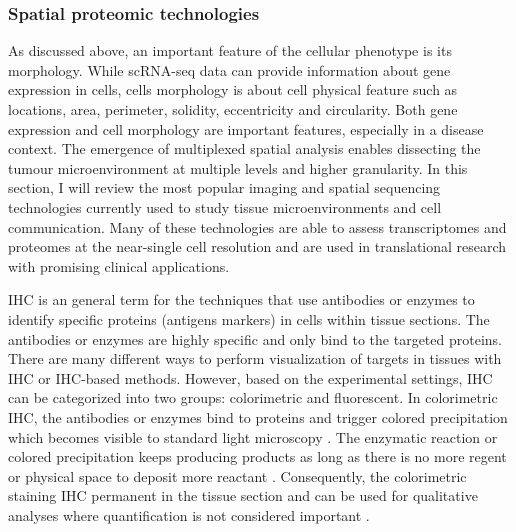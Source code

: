 \subsubsection{Spatial proteomic technologies}
As discussed above, an important feature of the cellular phenotype is its morphology. While scRNA-seq data can provide information about gene expression in cells, cells morphology is about cell physical feature such as locations, area, perimeter, solidity, eccentricity and circularity. Both gene expression and cell morphology are important features, especially in a disease context. The emergence of multiplexed spatial analysis enables dissecting the tumour microenvironment at multiple levels and higher granularity. In this section, I will review the most popular imaging and spatial sequencing technologies currently used to study tissue microenvironments and cell communication. Many of these technologies are able to assess transcriptomes and proteomes at the near-single cell resolution and are used in translational research with promising clinical applications. 

IHC is an general term for the techniques that use antibodies or enzymes to identify specific proteins (antigens markers) in cells within tissue sections. The antibodies or enzymes are highly specific and only bind to the targeted proteins. There are many different ways to perform visualization of targets in tissues with IHC or IHC-based methods. However, based on the experimental settings, IHC can be categorized into two groups: colorimetric and fluorescent. In colorimetric IHC, the antibodies or enzymes bind to proteins and trigger colored precipitation which becomes visible to standard light microscopy \cite{BOURGEOIS2014132}. The enzymatic reaction or colored precipitation keeps producing products as long as there is no more regent or physical space to deposit more reactant \cite{corthell2014basic}. Consequently, the colorimetric staining IHC permanent in the tissue section and can be used for qualitative analyses where quantification is not considered important \cite{seidal2001interpretation}. 

